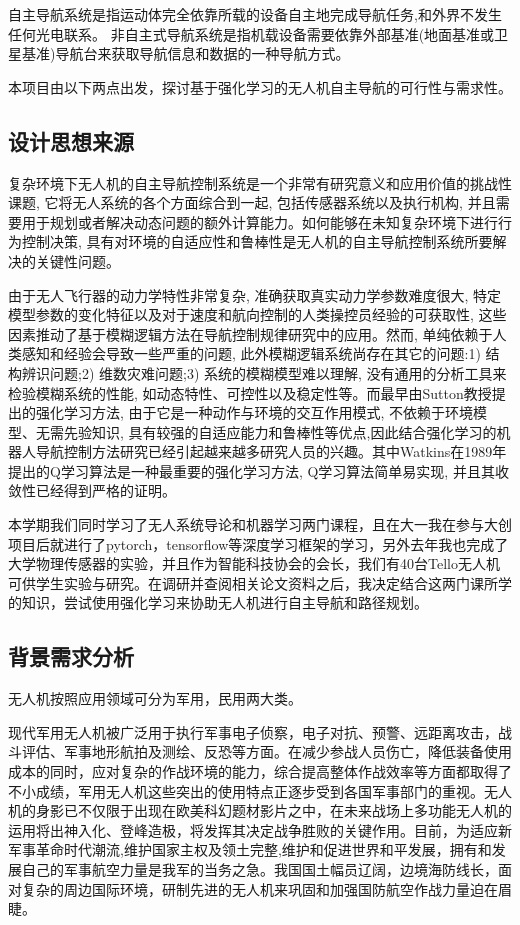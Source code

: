 \documentclass{thuemp}
\begin{document}
自主导航系统是指运动体完全依靠所载的设备自主地完成导航任务,和外界不发生任何光电联系。
非自主式导航系统是指机载设备需要依靠外部基准(地面基准或卫星基准)导航台来获取导航信息和数据的一种导航方式。

本项目由以下两点出发，探讨基于强化学习的无人机自主导航的可行性与需求性。


\subsection{设计思想来源}
复杂环境下无人机的自主导航控制系统是一个非常有研究意义和应用价值的挑战性课题, 它将无人系统的各个方面综合到一起, 包括传感器系统以及执行机构, 并且需要用于规划或者解决动态问题的额外计算能力。如何能够在未知复杂环境下进行行为控制决策, 具有对环境的自适应性和鲁棒性是无人机的自主导航控制系统所要解决的关键性问题。


由于无人飞行器的动力学特性非常复杂, 准确获取真实动力学参数难度很大, 特定模型参数的变化特征以及对于速度和航向控制的人类操控员经验的可获取性, 这些因素推动了基于模糊逻辑方法在导航控制规律研究中的应用。然而, 单纯依赖于人类感知和经验会导致一些严重的问题, 此外模糊逻辑系统尚存在其它的问题:1) 结构辨识问题;2) 维数灾难问题;3) 系统的模糊模型难以理解, 没有通用的分析工具来检验模糊系统的性能, 如动态特性、可控性以及稳定性等。而最早由Sutton教授提出的强化学习方法, 由于它是一种动作与环境的交互作用模式, 不依赖于环境模型、无需先验知识, 具有较强的自适应能力和鲁棒性等优点,因此结合强化学习的机器人导航控制方法研究已经引起越来越多研究人员的兴趣。其中Watkins在1989年提出的Q学习算法是一种最重要的强化学习方法, Q学习算法简单易实现, 并且其收敛性已经得到严格的证明\cite{一种基于强化学习的自主导航控制算法研究}。


本学期我们同时学习了无人系统导论和机器学习两门课程，且在大一我在参与大创项目后就进行了pytorch，tensorflow等深度学习框架的学习，另外去年我也完成了大学物理传感器的实验，并且作为智能科技协会的会长，我们有40台Tello无人机可供学生实验与研究。在调研并查阅相关论文资料之后，我决定结合这两门课所学的知识，尝试使用强化学习来协助无人机进行自主导航和路径规划。

\subsection{背景需求分析}
无人机按照应用领域可分为军用，民用两大类。

现代军用无人机被广泛用于执行军事电子侦察，电子对抗、预警、远距离攻击，战斗评估、军事地形航拍及测绘、反恐等方面。在减少参战人员伤亡，降低装备使用成本的同时，应对复杂的作战环境的能力，综合提高整体作战效率等方面都取得了不小成绩，军用无人机这些突出的使用特点正逐步受到各国军事部门的重视。无人机的身影已不仅限于出现在欧美科幻题材影片之中，在未来战场上多功能无人机的运用将出神入化、登峰造极，将发挥其决定战争胜败的关键作用。目前，为适应新军事革命时代潮流,维护国家主权及领土完整,维护和促进世界和平发展，拥有和发展自己的军事航空力量是我军的当务之急。我国国土幅员辽阔，边境海防线长，面对复杂的周边国际环境，研制先进的无人机来巩固和加强国防航空作战力量迫在眉睫。\cite{我国军用无人机发展趋势及现状分析}
\end{document}
